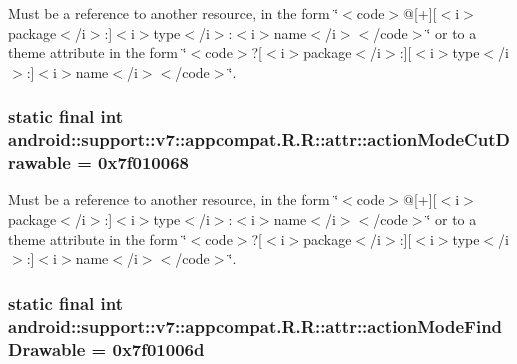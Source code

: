Must be a reference to another resource, in the form \char`\"{}$<$code$>$@\mbox{[}+\mbox{]}\mbox{[}$<$i$>$package$<$/i$>$:\mbox{]}$<$i$>$type$<$/i$>$:$<$i$>$name$<$/i$>$$<$/code$>$\char`\"{} or to a theme attribute in the form \char`\"{}$<$code$>$?\mbox{[}$<$i$>$package$<$/i$>$:\mbox{]}\mbox{[}$<$i$>$type$<$/i$>$:\mbox{]}$<$i$>$name$<$/i$>$$<$/code$>$\char`\"{}. \hypertarget{classandroid_1_1support_1_1v7_1_1appcompat_1_1_r_1_1attr_eb7c633282f64fe0bb0fe3ad2def572b}{
\subsubsection[{actionModeCutDrawable}]{\setlength{\rightskip}{0pt plus 5cm}static final int android::support::v7::appcompat.R.R::attr::actionModeCutDrawable = 0x7f010068}}
\label{classandroid_1_1support_1_1v7_1_1appcompat_1_1_r_1_1attr_eb7c633282f64fe0bb0fe3ad2def572b}


Must be a reference to another resource, in the form \char`\"{}$<$code$>$@\mbox{[}+\mbox{]}\mbox{[}$<$i$>$package$<$/i$>$:\mbox{]}$<$i$>$type$<$/i$>$:$<$i$>$name$<$/i$>$$<$/code$>$\char`\"{} or to a theme attribute in the form \char`\"{}$<$code$>$?\mbox{[}$<$i$>$package$<$/i$>$:\mbox{]}\mbox{[}$<$i$>$type$<$/i$>$:\mbox{]}$<$i$>$name$<$/i$>$$<$/code$>$\char`\"{}. \hypertarget{classandroid_1_1support_1_1v7_1_1appcompat_1_1_r_1_1attr_224751b8b91ce8a78f0052a7f4d94c33}{
\subsubsection[{actionModeFindDrawable}]{\setlength{\rightskip}{0pt plus 5cm}static final int android::support::v7::appcompat.R.R::attr::actionModeFindDrawable = 0x7f01006d}}
\label{classandroid_1_1support_1_1v7_1_1appcompat_1_1_r_1_1attr_224751b8b91ce8a78f0052a7f4d94c33}


